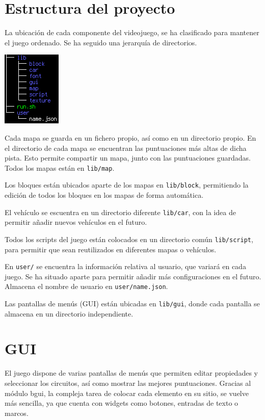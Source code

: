 \documentclass[11pt,a4paper,hidelinks]{article}
\begin{document}
\section{Estructura del proyecto}
La ubicación de cada componente del videojuego, se ha clasificado para mantener 
el juego ordenado. Se ha seguido una jerarquía de directorios.

\begin{center}
\includegraphics[scale=0.8]{dir}
\end{center}

Cada mapa se guarda en un fichero propio, así como en un directorio propio. En 
el directorio de cada mapa se encuentran las puntuaciones más altas de dicha 
pista. Esto permite compartir un mapa, junto con las puntuaciones guardadas.  
Todos los mapas están en \texttt{lib/map}.

Los bloques están ubicados aparte de los mapas en \texttt{lib/block}, 
permitiendo la edición de todos los bloques en los mapas de forma automática.

El vehículo se escuentra en un directorio diferente \texttt{lib/car}, con la 
idea de permitir añadir nuevos vehículos en el futuro.

Todos los scripts del juego están colocados en un directorio común 
\texttt{lib/script}, para permitir que sean reutilizados en diferentes mapas o 
vehículos.

En \texttt{user/} se encuentra la información relativa al usuario, que variará 
en cada juego. Se ha situado aparte para permitir añadir más configuraciones en 
el futuro. Almacena el nombre de usuario en \texttt{user/name.json}.

Las pantallas de menús (GUI) están ubicadas en \texttt{lib/gui}, donde cada 
pantalla se almacena en un directorio independiente.

\section{GUI}
El juego dispone de varias pantallas de menús que permiten editar propiedades y 
seleccionar los circuitos, así como mostrar las mejores puntuaciones. Gracias al 
módulo bgui, la compleja tarea de colocar cada elemento en su sitio, se vuelve 
más sencilla, ya que cuenta con widgets como botones, entradas de texto o 
marcos.
\end{document}
